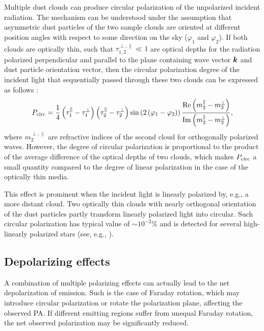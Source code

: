 Multiple dust clouds can produce circular polarization of the unpolarized incident radiation.
The mechanism can be understood under the assumption that asymmetric dust particles of the two sample clouds are oriented at different position angles with respect to some direction on the sky ($\varphi_1$ and $\varphi_2$).
If both clouds are optically thin, such that $\tau_{1,2}^{\perp, \parallel} \ll 1$ are optical depths for the radiation polarized perpendicular and parallel to the plane containing wave vector $\boldsymbol{k}$ and dust particle orientation vector, then the circular polarization degree of the incident light that sequentially passed through these two clouds can be expressed as follows \citep{PolarizationInCosmicMedium}:
\begin{equation}
    P_{\mathrm{circ}} = \frac{1}{4}\left(\tau_1^\parallel - \tau_1^\perp\right)\left(\tau_2^\parallel - \tau_2^\perp\right) \sin\left(2\left(\varphi_1 - \varphi_2\right)\right)\frac{\mathrm{Re}\left(m_2^\parallel - m_2^\perp\right)}{\mathrm{Im}\left(m_2^\parallel - m_2^\perp\right)},
\end{equation}
where $m_2^{\perp,\parallel}$ are refractive indices of the second cloud for orthogonally polarized waves.
However, the degree of circular polarization is proportional to the product of the average difference of the optical depths of two clouds, which makes $P_{\mathrm{circ}}$ a small quantity compared to the degree of linear polarization in the case of the optically thin media.

This effect is prominent when the incident light is linearly polarized by, e.g., a more distant cloud. 
Two optically thin clouds  with nearly orthogonal orientation of the dust particles partly transform linearly polarized light into circular.
Such circular polarization has typical value of $\sim10^{-2}\%$ and is detected for several high-linearly polarized stars (see, e.g., \citealt{Martin1976}).

\subsection{Depolarizing effects}

A combination of multiple polarizing effects can actually lead to the net depolarization of emission.
Such is the case of Faraday rotation, which may introduce circular polarization or rotate the polarization plane, affecting the observed \gls{PA}.
If different emitting regions suffer from unequal Faraday rotation, the net observed polarization may be significantly reduced.

